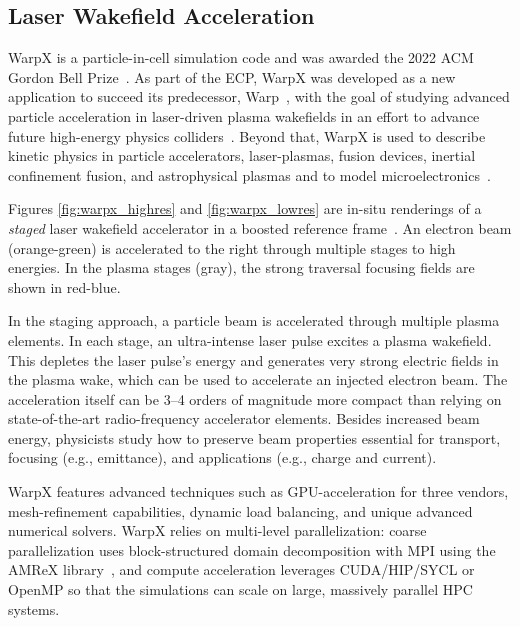 \subsection{Laser Wakefield Acceleration}\label{sec:warpx}

%
%
WarpX is a particle-in-cell simulation code and was awarded the 2022 ACM Gordon Bell Prize~\citep{FedeliHuebl2022}.
As part of the ECP, WarpX was developed as a new application to succeed its predecessor, Warp~\citep{Vay2013}, with the goal of studying advanced particle acceleration in laser-driven plasma wakefields in an effort to advance future high-energy physics colliders~\citep{Albert2021}.
Beyond that, WarpX is used to describe kinetic physics in particle accelerators, laser-plasmas, fusion devices, inertial confinement fusion, and astrophysical plasmas and to model microelectronics~\citep{Yao2022}.

Figures \ref{fig:warpx_highres} and \ref{fig:warpx_lowres} are in-situ renderings of a \emph{staged} laser wakefield accelerator in a boosted reference frame~\citep{Vay2011}.
An electron beam (orange-green) is accelerated to the right through multiple stages to high energies.
In the plasma stages (gray), the strong traversal focusing fields are shown in red-blue.

In the staging approach, a particle beam is accelerated through multiple plasma elements.
In each stage, an ultra-intense laser pulse excites a plasma wakefield.
This depletes the laser pulse's energy and generates very strong electric fields in the plasma wake, which can be used to accelerate an injected electron beam.
The acceleration itself can be 3--4 orders of magnitude more compact than relying on state-of-the-art radio-frequency accelerator elements.
Besides increased beam energy, physicists study how to preserve beam properties essential for transport, focusing (e.g., emittance), and applications (e.g., charge and current).

WarpX features advanced techniques such as GPU-acceleration for three vendors, mesh-refinement capabilities, dynamic load balancing, and unique advanced numerical solvers.
WarpX relies on multi-level parallelization: coarse parallelization uses block-structured domain decomposition with MPI using the AMReX library~\citep{Zhang2019}, and compute acceleration leverages CUDA/HIP/SYCL or OpenMP so that the simulations can scale on large, massively parallel HPC systems.

